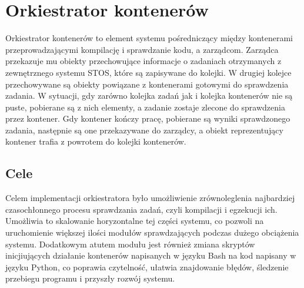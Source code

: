 \section{Orkiestrator kontenerów}
Orkiestrator kontenerów to element systemu pośredniczący między kontenerami przeprowadzającymi kompilację i sprawdzanie kodu, a zarządcom. Zarządca przekazuje mu obiekty przechowujące informacje o zadaniach otrzymanych z zewnętrznego systemu STOS, które są zapisywane do kolejki. W drugiej kolejce przechowywane są obiekty powiązane z kontenerami gotowymi do sprawdzenia zadania. W sytuacji, gdy zarówno kolejka zadań jak i kolejka kontenerów nie są puste, pobierane są z nich elementy, a zadanie zostaje zlecone do sprawdzenia przez kontener. Gdy kontener kończy pracę, pobierane są wyniki sprawdzonego zadania, następnie są one przekazywane do zarządcy, a obiekt reprezentujący kontener trafia z powrotem do kolejki kontenerów.

\subsection{Cele}
Celem implementacji orkiestratora było umożliwienie zrównoleglenia najbardziej czasochłonnego procesu sprawdzania zadań, czyli kompilacji i egzekucji ich. Umożliwia to skalowanie horyzontalne tej części systemu, co pozwoli na uruchomienie większej ilości modułów sprawdzających podczas dużego obciążenia systemu. Dodatkowym atutem modułu jest również zmiana skryptów inicjiujących działanie kontenerów napisanych w języku Bash na kod napisany w języku Python, co poprawia czytelność, ułatwia znajdowanie błędów, śledzenie przebiegu programu i przyszły rozwój systemu.


